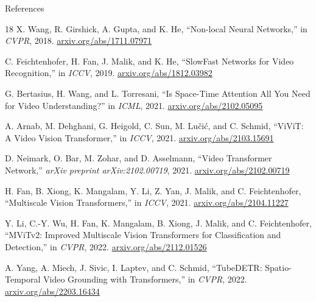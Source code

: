 \begin{frame}[allowframebreaks]{References}
\begin{thebibliography}{18}
        X. Wang, R. Girshick, A. Gupta, and K. He,
        \newblock ``Non-local Neural Networks,''
        \newblock in \emph{CVPR}, 2018.
        \newblock \href{https://arxiv.org/abs/1711.07971}{arxiv.org/abs/1711.07971}

        C. Feichtenhofer, H. Fan, J. Malik, and K. He,
        \newblock ``SlowFast Networks for Video Recognition,''
        \newblock in \emph{ICCV}, 2019.
        \newblock \href{https://arxiv.org/abs/1812.03982}{arxiv.org/abs/1812.03982}

        G. Bertasius, H. Wang, and L. Torresani,
        \newblock ``Is Space-Time Attention All You Need for Video Understanding?''
        \newblock in \emph{ICML}, 2021.
        \newblock \href{https://arxiv.org/abs/2102.05095}{arxiv.org/abs/2102.05095}

        A. Arnab, M. Dehghani, G. Heigold, C. Sun, M. Lu\v{c}i\'c, and C. Schmid,
        \newblock ``ViViT: A Video Vision Transformer,''
        \newblock in \emph{ICCV}, 2021.
        \newblock \href{https://arxiv.org/abs/2103.15691}{arxiv.org/abs/2103.15691}

        D. Neimark, O. Bar, M. Zohar, and D. Asselmann,
        \newblock ``Video Transformer Network,''
        \newblock \emph{arXiv preprint arXiv:2102.00719}, 2021.
        \newblock \href{https://arxiv.org/abs/2102.00719}{arxiv.org/abs/2102.00719}

        H. Fan, B. Xiong, K. Mangalam, Y. Li, Z. Yan, J. Malik, and C. Feichtenhofer,
        \newblock ``Multiscale Vision Transformers,''
        \newblock in \emph{ICCV}, 2021.
        \newblock \href{https://arxiv.org/abs/2104.11227}{arxiv.org/abs/2104.11227}

        Y. Li, C.-Y. Wu, H. Fan, K. Mangalam, B. Xiong, J. Malik, and C. Feichtenhofer,
        \newblock ``MViTv2: Improved Multiscale Vision Transformers for Classification and Detection,''
        \newblock in \emph{CVPR}, 2022.
        \newblock \href{https://arxiv.org/abs/2112.01526}{arxiv.org/abs/2112.01526}

        A. Yang, A. Miech, J. Sivic, I. Laptev, and C. Schmid,
        \newblock ``TubeDETR: Spatio-Temporal Video Grounding with Transformers,''
        \newblock in \emph{CVPR}, 2022.
        \newblock \href{https://arxiv.org/abs/2203.16434}{arxiv.org/abs/2203.16434}


\end{thebibliography}
\end{frame}
